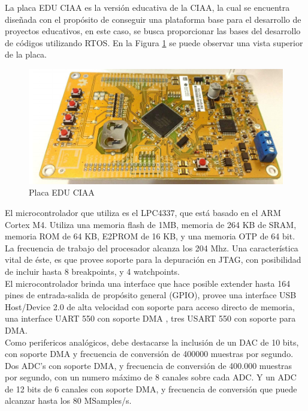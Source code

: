 \documentclass[12pt,letterpaper]{article}
\begin{document}
La placa EDU CIAA es la versión educativa de la CIAA, la cual se encuentra diseñada con el propósito de conseguir una plataforma base para el desarrollo de proyectos educativos, en este caso, se busca proporcionar las bases del desarrollo de códigos utilizando RTOS. En la Figura \ref{Fig_placa} se puede observar una vista superior de la placa.

\begin{figure}[H]
\centering
\includegraphics[width=10 cm]{figuras/descripcion1.png}
\caption{Placa EDU CIAA}
\label{Fig_placa}
\end{figure}

El microcontrolador que utiliza es el LPC4337, que está basado en el ARM Cortex M4. Utiliza una memoria flash de 1MB, memoria de 264 KB de SRAM, memoria ROM de 64 KB, E2PROM de 16 KB, y una memoria OTP de 64 bit.
  \\

La frecuencia de trabajo del procesador alcanza los 204 Mhz. Una característica vital de éste, es que provee soporte para la depuración en JTAG, con posibilidad de incluir hasta 8 breakpoints, y 4 watchpoints.
  \\

El microcontrolador brinda una interface que hace posible extender hasta 164 pines de entrada-salida de propósito general (GPIO), provee una interface USB Host/Device 2.0 de alta velocidad con soporte para acceso directo de memoria, una interface UART 550 con soporte DMA , tres USART 550 con soporte para DMA\cite{descripcionenhojadatos}.
  \\

Como perifericos analógicos, debe destacarse la inclusión de un DAC de 10 bits, con soporte DMA y frecuencia de conversión de 400000 muestras por segundo. Dos ADC's con soporte DMA, y frecuencia de conversión de 400.000 muestras por segundo, con un numero máximo de 8 canales sobre cada ADC. Y un ADC de 12 bits de 6 canales con soporte DMA, y frecuencia de conversión que puede alcanzar hasta los 80 MSamples/s.
  \\
\end{document}
